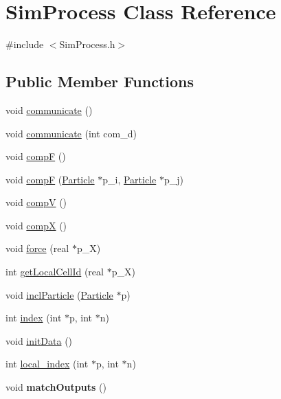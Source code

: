 \hypertarget{class_sim_process}{\section{Sim\-Process Class Reference}
\label{class_sim_process}
}


{\ttfamily \#include $<$Sim\-Process.\-h$>$}

\subsection*{Public Member Functions}
\begin{DoxyCompactItemize}
\item 
void \hyperlink{class_sim_process_af170569cb5d5bc65bf0b67deab68839f}{communicate} ()
\item 
void \hyperlink{class_sim_process_a30d24be4528ae0124f1361728161fbbf}{communicate} (int com\-\_\-d)
\item 
void \hyperlink{class_sim_process_a9d0c150b73ae309c3e96ab382ab61f9e}{comp\-F} ()
\item 
void \hyperlink{class_sim_process_ab2679cc6243a3d4e81a5f5861184987b}{comp\-F} (\hyperlink{struct_particle}{Particle} $\ast$p\-\_\-i, \hyperlink{struct_particle}{Particle} $\ast$p\-\_\-j)
\item 
void \hyperlink{class_sim_process_abc49f8acd0c4270d51c15bc9f6652fc7}{comp\-V} ()
\item 
void \hyperlink{class_sim_process_a78b3218639bf7629fce8145b29980d3c}{comp\-X} ()
\item 
void \hyperlink{class_sim_process_a08f5a7ddd82b047ec1f84652c14830e0}{force} (real $\ast$p\-\_\-\-X)
\item 
int \hyperlink{class_sim_process_a0d2407147ec5be00e873af72a77f7203}{get\-Local\-Cell\-Id} (real $\ast$p\-\_\-\-X)
\item 
void \hyperlink{class_sim_process_ae6eca603294352ce686e35318276c230}{incl\-Particle} (\hyperlink{struct_particle}{Particle} $\ast$p)
\item 
int \hyperlink{class_sim_process_aa12b5bc940fd85d5665b759ac576edf6}{index} (int $\ast$p, int $\ast$n)
\item 
void \hyperlink{class_sim_process_ae1838f9b1ac92c6dcd8d41b1f970fa83}{init\-Data} ()
\item 
int \hyperlink{class_sim_process_a5bfb783797acec8f74e4eb403f67481f}{local\-\_\-index} (int $\ast$p, int $\ast$n)
\item 
\hypertarget{class_sim_process_ad1fb118fe2f4f9b3b730f33a386c84d6}{void {\bfseries match\-Outputs} ()}\label{class_sim_process_ad1fb118fe2f4f9b3b730f33a386c84d6}


\end{DoxyCompactItemize}
